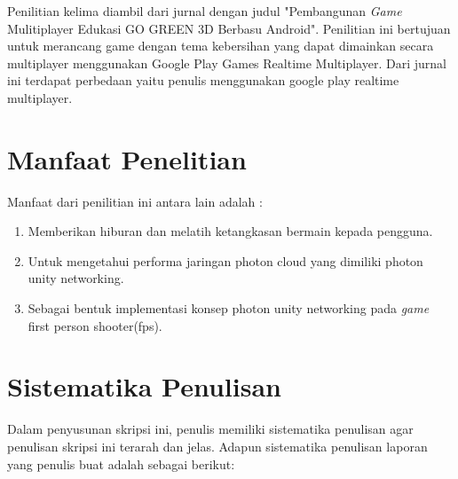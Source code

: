 Penilitian kelima diambil dari jurnal dengan judul "Pembangunan \textit{Game} Mulitiplayer Edukasi GO GREEN 3D
Berbasu Android". Penilitian ini bertujuan untuk merancang game dengan tema kebersihan yang dapat dimainkan secara multiplayer menggunakan Google Play Games Realtime Multiplayer. Dari jurnal ini terdapat perbedaan yaitu penulis menggunakan google play realtime multiplayer.

\section{Manfaat Penelitian}
Manfaat dari penilitian ini antara lain adalah : 
\begin{enumerate}
	\item Memberikan hiburan dan melatih ketangkasan bermain 
	kepada pengguna.
	\item Untuk mengetahui performa jaringan photon cloud yang dimiliki photon unity networking.
	\item Sebagai bentuk implementasi konsep photon unity networking pada \textit{\textit{game}} first person shooter(fps).
\end{enumerate}

\section{Sistematika Penulisan}
\noindent

Dalam penyusunan skripsi ini, penulis memiliki sistematika penulisan agar 
penulisan skripsi ini terarah dan jelas. Adapun sistematika penulisan laporan yang 
penulis buat adalah sebagai berikut:

